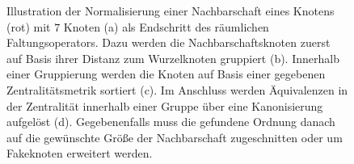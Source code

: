 \begin{figure}[t]
{
}
\caption[Normalisierung]{Illustration der Normalisierung einer Nachbarschaft eines Knotens (rot) mit $7$ Knoten (a) als Endschritt des räumlichen Faltungsoperators.
Dazu werden die Nachbarschaftsknoten zuerst auf Basis ihrer Distanz zum Wurzelknoten gruppiert (b).
Innerhalb einer Gruppierung werden die Knoten auf Basis einer gegebenen Zentralitätsmetrik sortiert (c).
Im Anschluss werden Äquivalenzen in der Zentralität innerhalb einer Gruppe über eine Kanonisierung aufgelöst (d).
Gegebenenfalls muss die gefundene Ordnung danach auf die gewünschte Größe der Nachbarschaft zugeschnitten oder um Fakeknoten erweitert werden.}
\label{fig:raeumliche_faltung}
\end{figure}
